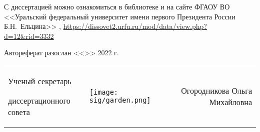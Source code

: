 \vspace{0.008\paperheight plus1fill}
С диссертацией можно ознакомиться в библиотеке
и на сайте ФГАОУ ВО
<<Уральский федеральный университет имени первого Президента России Б.Н.~Ельцина>>%
,
{
  \small
  \url{https://dissovet2.urfu.ru/mod/data/view.php?d=12&rid=3332}
}

\vspace{0.008\paperheight plus1fill}
{
Автореферат разослан
<<\underline{\hspace{2em}}>>
\underline{\hspace{7em}}
2022 г.}

\vspace{0.008\paperheight plus1fill}
\noindent%
\begin{tabularx}{\textwidth}{@{}%
>{\raggedright\arraybackslash}b{12em}@{}
>{\centering\arraybackslash}X
r
@{}}
    Ученый секретарь\par
    диссертационного совета
    &
    \texttt{[image: sig/garden.png]}
    &
    Огородникова Ольга Михайловна
\end{tabularx}


\clearpage
